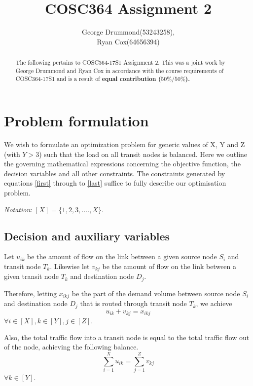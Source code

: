 \documentclass[12pt,twoside]{article}
\begin{document}
\title{COSC364 Assignment 2}
\author{George Drummond(53243258), \\Ryan Cox(64656394)}
\maketitle
\thispagestyle{empty}

\begin{abstract}
The following pertains to COSC364-17S1  Assignment 2.
This was a joint work by George Drummond and Ryan Cox in accordance with the course requirements of COSC364-17S1 and is a result of \bf{equal} contribution ($50\% / 50\%$).
\end{abstract}

\tableofcontents

\newpage
\section{Problem formulation}
We wish to formulate an optimization problem for generic values of X, Y and Z (with $ Y> 3$) such that the load on all transit nodes is balanced. Here we outline the governing mathematical expressions concerning the objective function, the decision variables and all other constraints. The constraints generated by equations \ref{first} through to \ref{last} suffice to fully describe our optimisation problem.

\emph{Notation}: $[X] = \{1,2,3,....,X\}$.

\subsection{Decision and auxiliary variables}
Let $u_{ik}$ be the amount of flow on the link between a given source node $S_i$ and transit node $T_k$.
Likewise let $v_{kj}$ be the amount of flow on the link between a given transit node $T_k$ and destination node $D_j$.

Therefore, letting $x_{ikj}$ be the part of the demand volume between source node $S_i$ and destination node $D_j$ that is routed through transit node $T_k$, we achieve 
\begin{equation}\label{first}
	u_{ik} + v_{kj} = x_{ikj} 
\end{equation}
$\forall i \in [X], k \in [Y], j \in [Z]$.

Also, the total traffic flow into a transit node is equal to the total traffic flow out of the node, achieving the following balance.
\begin{equation}
	\sum_{i=1}^{X}u_{ik} = \sum_{j=1}^{Z}v_{kj}
\end{equation}
$\forall k \in [Y]$.
\end{document}
